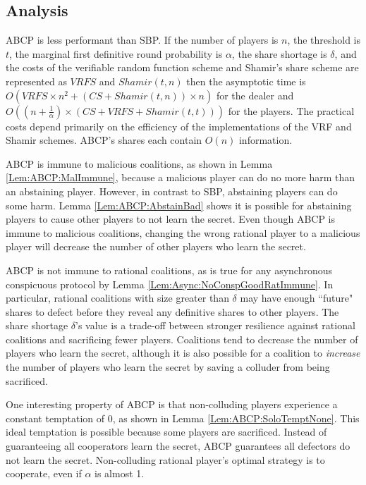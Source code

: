 \documentclass{dalcsthesis}
\begin{document}
\subsection{Analysis}

ABCP is less performant than SBP. If the number of players is $n$, the threshold is $t$, the marginal first definitive round probability is $\alpha$, the share shortage is $\delta$, and the costs of the verifiable random function scheme and Shamir's share scheme are represented as $VRFS$ and $Shamir(t, n)$ then the asymptotic time is $O(VRFS  \times n^2 + (CS + Shamir(t, n)) \times n)$ for the dealer and $O((n + \frac{1}{\alpha}) \times (CS + VRFS + Shamir(t, t)))$ for the players. The practical costs depend primarily on the efficiency of the implementations of the VRF and Shamir schemes. ABCP's shares each contain $O(n)$ information.

ABCP is immune to malicious coalitions, as shown in Lemma \ref{Lem:ABCP:MalImmune}, because a malicious player can do no more harm than an abstaining player. However, in contrast to SBP, abstaining players can do some harm. Lemma \ref{Lem:ABCP:AbstainBad} shows it is possible for abstaining players to cause other players to not learn the secret. Even though ABCP is immune to malicious coalitions, changing the wrong rational player to a malicious player will decrease the number of other players who learn the secret.

ABCP is not immune to rational coalitions, as is true for any asynchronous conspicuous protocol by Lemma \ref{Lem:Async:NoConspGoodRatImmune}. In particular, rational coalitions with size greater than $\delta$ may have enough ``future" shares to defect before they reveal any definitive shares to other players. The share shortage $\delta$'s value is a trade-off between stronger resilience against rational coalitions and sacrificing fewer players. Coalitions tend to decrease the number of players who learn the secret, although it is also possible for a coalition to \emph{increase} the number of players who learn the secret by saving a colluder from being sacrificed.

One interesting property of ABCP is that non-colluding players experience a constant temptation of $0$, as shown in Lemma \ref{Lem:ABCP:SoloTemptNone}. This ideal temptation is possible because some players are sacrificed. Instead of guaranteeing all cooperators learn the secret, ABCP guarantees all defectors do not learn the secret. Non-colluding rational player's optimal strategy is to cooperate, even if $\alpha$ is almost 1.
\end{document}
